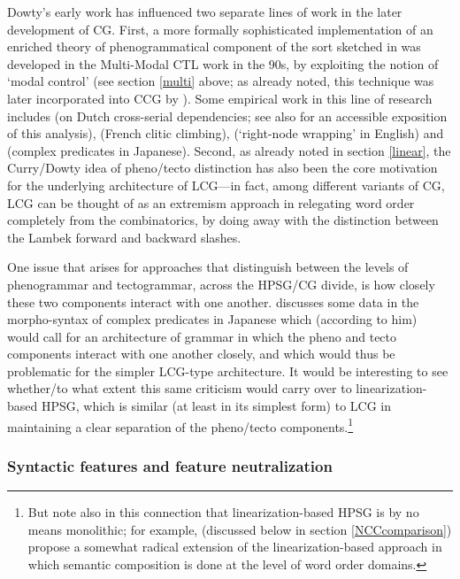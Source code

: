 \documentclass[output=paper]{langsci/langscibook}
\begin{document}
Dowty's early work has influenced two separate lines of work in the
later development of CG. First, a more formally sophisticated
implementation of an enriched theory of phenogrammatical component of
the sort sketched in \citet{Dowty90a-Eng} was developed in the Multi-Modal
CTL work in the 90s, by exploiting the notion of `modal control' (see
section \ref{multi} above; as already noted, this technique was 
later incorporated into CCG by \citet{Baldridge2002a-u}). Some empirical
work in this line of research includes \citet{moortgatoehrle94} (on Dutch
cross-serial dependencies; see also \citet{dowty96} for an accessible
exposition of this analysis), \citet{kraak98} (French clitic climbing),
\citet{whitman2009} (`right-node wrapping' in English) and
\citet{kubota-diss,Kubota2014a-u} (complex predicates in Japanese). Second,
as already noted in section \ref{linear}, the Curry/Dowty idea of
pheno/tecto distinction has also been the core motivation for the
underlying architecture of LCG---in fact, among different variants of
CG, LCG can be thought of as an extremism approach in
relegating word order completely from the combinatorics, by
doing away with the distinction between the Lambek forward and backward slashes.

One issue that arises for approaches that distinguish between the
levels of phenogrammar and tectogrammar, across the HPSG/CG divide, is
how closely these two components interact with one another.
\citet{Kubota2014a-u} discusses some data in the morpho-syntax of
complex predicates in Japanese which (according to him) would call for
an architecture of grammar in which the pheno and tecto components
interact with one another closely, and which would thus be problematic
for the simpler LCG-type architecture. It would be interesting to see
whether/to what extent this same criticism would carry over to
linearization-based HPSG, which is similar (at least in its simplest
form) to LCG in maintaining a clear separation of the pheno/tecto
components.\footnote{But note also in this connection that
linearization-based HPSG is by no means monolithic; for example,
\citet{yatabe-tam2017} (discussed below in section
\ref{NCCcomparison}) propose a somewhat radical extension of the
linearization-based approach in which semantic composition is done at
the level of word order domains.}


\subsubsection{Syntactic features and feature neutralization}
\end{document}
